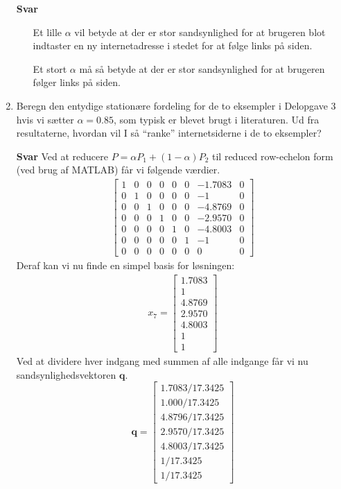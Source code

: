 \documentclass[10pt,a4paper]{article}
\begin{document}
\begin{enumerate}
	\item[\textbf{Svar}] 
		\begin{enumerate}
			\item[] Et lille $\alpha$ vil betyde at der er stor sandsynlighed for at brugeren blot indtaster en ny internetadresse i stedet for at følge links på siden. 
			\item[] Et stort $\alpha$ må så betyde at der er stor sandsynlighed for at brugeren følger links på siden.
		\end{enumerate}
	\item Beregn den entydige stationære fordeling for de to eksempler i Delopgave 3 hvis vi sætter $\alpha=0.85$, som typisk er blevet brugt i literaturen. Ud fra resultaterne, hvordan vil I så ``ranke'' internetsiderne i de to eksempler?
	\item[\textbf{Svar}]
	Ved at reducere $P=\alpha P_1+(1-\alpha)P_2$ til reduced row-echelon form (ved brug af MATLAB) får vi følgende værdier.
	\begin{align*}
		\begin{bmatrix}
			1 & 0 & 0 & 0 & 0 & 0 & -1.7083 & 0 \\
			0 & 1 & 0 & 0 & 0 & 0 & -1 & 0 \\
			0 & 0 & 1 & 0 & 0 & 0 & -4.8769 & 0 \\
			0 & 0 & 0 & 1 & 0 & 0 & -2.9570 & 0 \\
			0 & 0 & 0 & 0 & 1 & 0 & -4.8003 & 0 \\
			0 & 0 & 0 & 0 & 0 & 1 & -1 & 0 \\
			0 & 0 & 0 & 0 & 0 & 0 & 0 & 0
		\end{bmatrix}
	\end{align*}
	Deraf kan vi nu finde en simpel basis for løsningen:
	\begin{align*}
		x_7 = \begin{bmatrix}
			1.7083 \\ 1 \\ 4.8769 \\ 2.9570 \\ 4.8003 \\ 1 \\ 1
		\end{bmatrix}
	\end{align*}
	Ved at dividere hver indgang med summen af alle indgange får vi nu sandsynlighedsvektoren $\mathbf{q}$.
	 \[\mathbf{q}=
	 \begin{bmatrix}
		 1.7083/17.3425 \\ 1.000/17.3425 \\ 4.8796/17.3425 \\ 2.9570/17.3425 \\ 4.8003/17.3425 \\ 1/17.3425 \\ 1/17.3425

\end{bmatrix}\]
\end{enumerate}
\end{document}
